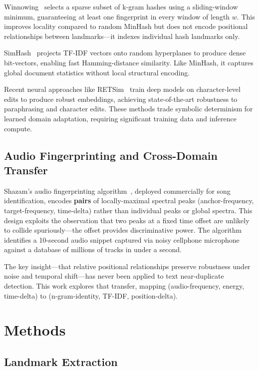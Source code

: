 \documentclass[11pt,letterpaper]{article}
\begin{document}
Winnowing~\citep{Schleimer2003} selects a sparse subset of k-gram hashes using a sliding-window minimum, guaranteeing at least one fingerprint in every window of length $w$. This improves locality compared to random MinHash but does not encode positional relationships between landmarks---it indexes individual hash landmarks only.

SimHash~\citep{Charikar2002} projects TF-IDF vectors onto random hyperplanes to produce dense bit-vectors, enabling fast Hamming-distance similarity. Like MinHash, it captures global document statistics without local structural encoding.

Recent neural approaches like RETSim~\citep{Zhang2023} train deep models on character-level edits to produce robust embeddings, achieving state-of-the-art robustness to paraphrasing and character edits. These methods trade symbolic determinism for learned domain adaptation, requiring significant training data and inference compute.

\subsection{Audio Fingerprinting and Cross-Domain Transfer}

Shazam's audio fingerprinting algorithm~\citep{Wang2003}, deployed commercially for song identification, encodes \textbf{pairs} of locally-maximal spectral peaks (anchor-frequency, target-frequency, time-delta) rather than individual peaks or global spectra. This design exploits the observation that two peaks at a fixed time offset are unlikely to collide spuriously---the offset provides discriminative power. The algorithm identifies a 10-second audio snippet captured via noisy cellphone microphone against a database of millions of tracks in under a second.

The key insight---that relative positional relationships preserve robustness under noise and temporal shift---has never been applied to text near-duplicate detection. This work explores that transfer, mapping (audio-frequency, energy, time-delta) to (n-gram-identity, TF-IDF, position-delta).

\section{Methods}

\subsection{Landmark Extraction}
\end{document}
